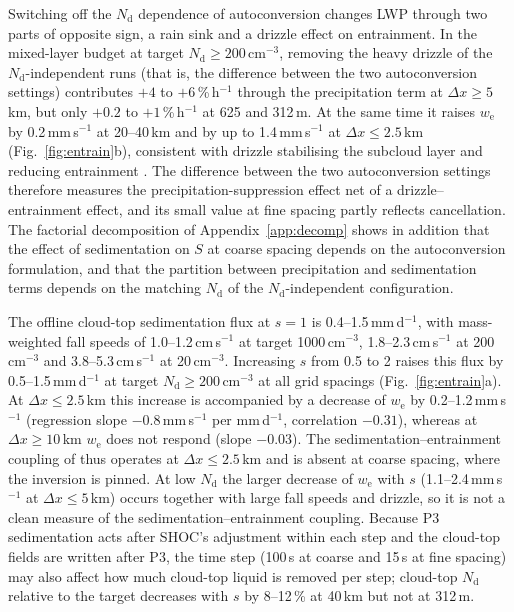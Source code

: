 \documentclass[acp, manuscript]{copernicus}
\newcommand{\Nd}{N_\mathrm{d}}
\newcommand{\we}{w_\mathrm{e}}
\newcommand{\dx}{\Delta x}
\newcommand{\cmthree}{\mathrm{cm^{-3}}}
\begin{document}
Switching off the $\Nd$ dependence of autoconversion changes LWP through two parts of opposite sign, a rain sink and a drizzle effect on entrainment. In the mixed-layer budget at target $\Nd\geq200\,\cmthree$, removing the heavy drizzle of the $\Nd$-independent runs (that is, the difference between the two autoconversion settings) contributes $+4$ to $+6$\,\%\,h$^{-1}$ through the precipitation term at $\dx\geq5$\,km, but only $+0.2$ to $+1$\,\%\,h$^{-1}$ at 625 and 312\,m. At the same time it raises $\we$ by 0.2\,mm\,s$^{-1}$ at 20--40\,km and by up to 1.4\,mm\,s$^{-1}$ at $\dx\leq2.5$\,km (Fig.~\ref{fig:entrain}b), consistent with drizzle stabilising the subcloud layer and reducing entrainment \citep{stevens1998,ackerman2009}. The difference between the two autoconversion settings therefore measures the precipitation-suppression effect net of a drizzle--entrainment effect, and its small value at fine spacing partly reflects cancellation. The factorial decomposition of Appendix~\ref{app:decomp} shows in addition that the effect of sedimentation on $S$ at coarse spacing depends on the autoconversion formulation, and that the partition between precipitation and sedimentation terms depends on the matching $\Nd$ of the $\Nd$-independent configuration.

The offline cloud-top sedimentation flux at $s=1$ is 0.4--1.5\,mm\,d$^{-1}$, with mass-weighted fall speeds of 1.0--1.2\,cm\,s$^{-1}$ at target 1000\,$\cmthree$, 1.8--2.3\,cm\,s$^{-1}$ at 200\,$\cmthree$ and 3.8--5.3\,cm\,s$^{-1}$ at 20\,$\cmthree$. Increasing $s$ from 0.5 to 2 raises this flux by 0.5--1.5\,mm\,d$^{-1}$ at target $\Nd\geq200\,\cmthree$ at all grid spacings (Fig.~\ref{fig:entrain}a). At $\dx\leq2.5$\,km this increase is accompanied by a decrease of $\we$ by 0.2--1.2\,mm\,s$^{-1}$ (regression slope $-0.8$\,mm\,s$^{-1}$ per mm\,d$^{-1}$, correlation $-0.31$), whereas at $\dx\geq10$\,km $\we$ does not respond (slope $-0.03$). The sedimentation--entrainment coupling of \citet{bretherton2007} thus operates at $\dx\leq2.5$\,km and is absent at coarse spacing, where the inversion is pinned. At low $\Nd$ the larger decrease of $\we$ with $s$ (1.1--2.4\,mm\,s$^{-1}$ at $\dx\leq5$\,km) occurs together with large fall speeds and drizzle, so it is not a clean measure of the sedimentation--entrainment coupling. Because P3 sedimentation acts after SHOC's adjustment within each step and the cloud-top fields are written after P3, the time step (100\,s at coarse and 15\,s at fine spacing) may also affect how much cloud-top liquid is removed per step; cloud-top $\Nd$ relative to the target decreases with $s$ by 8--12\,\% at 40\,km but not at 312\,m.
\end{document}
